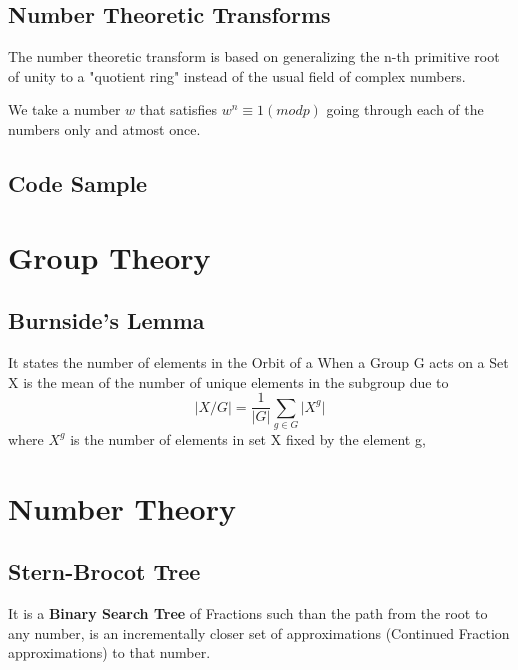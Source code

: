 \subsection{Number Theoretic Transforms}

The number theoretic transform is based on generalizing the n-th primitive root of unity to a "quotient ring" instead of the usual field of complex numbers.

We take a number $w$ that satisfies $w^n \equiv 1 (mod p)$ going through each of the numbers only and atmost once.


\subsection{Code Sample}





\section{Group Theory}


\subsection{Burnside's Lemma}

It states the number of elements in the Orbit of a When a Group G acts on a Set X is the mean of the number of unique elements in the subgroup due to
\begin{equation}
  \vert X / G \vert = \frac{1}{\vert G \vert} \sum_{g \in G} \vert X^g \vert
\end{equation}
where $X^g$ is the number of elements in set X fixed by the element g,



\section{Number Theory}


\subsection{Stern-Brocot Tree}

It is a \textbf{Binary Search Tree} of Fractions such than the path from the root to any number, is an incrementally closer set of approximations (Continued Fraction approximations) to that number.


